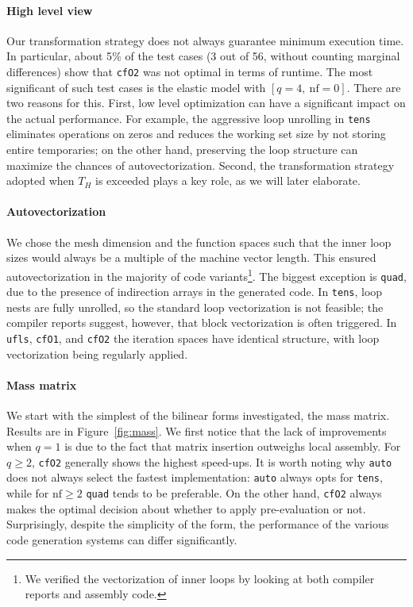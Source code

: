 \paragraph{High level view}
Our transformation strategy does not always guarantee minimum execution time. In particular, about 5$\%$ of the test cases (3 out of 56, without counting marginal differences) show that \texttt{cfO2} was not optimal in terms of runtime. The most significant of such test cases is the elastic model with $[q=4,\ \mathrm{nf}=0]$. There are two reasons for this. First, low level optimization can have a significant impact on the actual performance. For example, the aggressive loop unrolling in \texttt{tens} eliminates operations on zeros and reduces the working set size by not storing entire temporaries; on the other hand, preserving the loop structure can maximize the chances of autovectorization. Second, the transformation strategy adopted when $T_H$ is exceeded plays a key role, as we will later elaborate.

\paragraph{Autovectorization}
 
We chose the mesh dimension and the function spaces such that the inner loop sizes would always be a multiple of the machine vector length. This ensured autovectorization in the majority of code variants\footnote{We verified the vectorization of inner loops by looking at both compiler reports and assembly code.}. The biggest exception is \texttt{quad}, due to the presence of indirection arrays in the generated code. In \texttt{tens}, loop nests are fully unrolled, so the standard loop vectorization is not feasible; the compiler reports suggest, however, that block vectorization \cite{SLP-vect} is often triggered. In \texttt{ufls}, \texttt{cfO1}, and \texttt{cfO2} the iteration spaces have identical structure, with loop vectorization being regularly applied.

\paragraph{Mass matrix}
We start with the simplest of the bilinear forms investigated, the mass matrix. Results are in Figure~\ref{fig:mass}. We first notice that the lack of improvements when $q=1$ is due to the fact that matrix insertion outweighs local assembly. For $q \geq 2$, \texttt{cfO2} generally shows the highest speed-ups. It is worth noting why \texttt{auto} does not always select the fastest implementation: \texttt{auto} always opts for \texttt{tens}, while for $\mathrm{nf} \geq 2$ \texttt{quad} tends to be preferable. On the other hand, \texttt{cfO2} always makes the optimal decision about whether to apply pre-evaluation or not. Surprisingly, despite the simplicity of the form, the performance of the various code generation systems can differ significantly.

